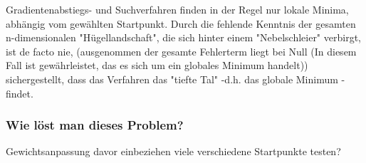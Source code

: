   Gradientenabstiegs- und Suchverfahren finden in der Regel nur lokale Minima, abhängig vom gewählten Startpunkt. Durch die fehlende Kenntnis der gesamten n-dimensionalen "Hügellandschaft", die sich hinter 
  einem "Nebelschleier" verbirgt, ist de facto nie, (ausgenommen der gesamte Fehlerterm liegt bei Null (In diesem Fall ist gewährleistet, das es sich um ein globales Minimum handelt))
  sichergestellt, dass das Verfahren das "tiefte Tal" -d.h. das globale Minimum - findet.

\subsubsection{Wie löst man dieses Problem?}\label{subsec:gradientenverfahren:fehlerquellen_problem_loesen}
  Gewichtsanpassung davor einbeziehen
  viele verschiedene Startpunkte testen?


